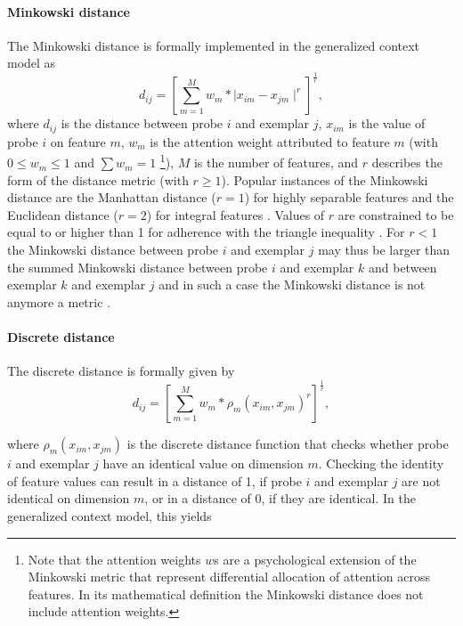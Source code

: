 \documentclass[a4paper,man,natbib]{apa6}
\begin{document}
\paragraph{Minkowski distance}
The Minkowski distance is formally implemented in the generalized context model as
\begin{equation}
d_{ij} = \left[\sum\limits_{m=1}^M w_{m}*\mid x_{im} - x_{jm}\mid ^r\right]^\frac{1}{r},
\end{equation}
where $d_{ij}$ is the distance between probe $i$ and exemplar $j$, $x_{im}$ is the value of probe $i$ on feature $m$, $w_{m}$ is the attention weight attributed to feature $m$ (with $0 \leq w_{m} \leq 1$ and $\sum w_{m} = 1$ \footnote{Note that the attention weights $w$s are a psychological extension of the Minkowski metric that represent differential allocation of attention across features. In its mathematical definition the Minkowski distance does not include attention weights.}), $M$ is the number of features, and $r$ describes the form of the distance metric (with $r \geq 1$). Popular instances of the Minkowski distance are the Manhattan distance ($r = 1$) for highly separable features and the Euclidean distance ($r = 2$) for integral features \citep{shepard1964attention, nosofsky1986attention, garner1974processing}. Values of $r$ are constrained to be equal to or higher than 1 for adherence with the triangle inequality \citep{jakel2008similarity,francois2007concentration,tversky1982similarity,beals1968foundations}. For $r < 1$ the Minkowski distance between probe $i$ and exemplar $j$ may thus be larger than the summed Minkowski distance between probe $i$ and exemplar $k$ and between exemplar $k$ and exemplar $j$ and in such a case the Minkowski distance is not anymore a metric \citep[][p. 5]{kress1989linear}. 

\paragraph{Discrete distance}
The discrete distance is formally given by 
\begin{equation}
d_{ij} = \left[\sum\limits_{m=1}^M w_{m}* \rho_{m}(x_{im}, x_{jm}) ^r\right]^\frac{1}{r},
\label{eq:distance}
\end{equation}

where $\rho_{m}(x_{im}, x_{jm})$ is the discrete distance function that checks whether probe $i$ and exemplar $j$ have an identical value on dimension $m$. Checking the identity of feature values can result in a distance of 1, if probe $i$ and exemplar $j$ are not identical on dimension $m$, or in a distance of 0, if they are identical. In the generalized context model, this yields
\end{document}

